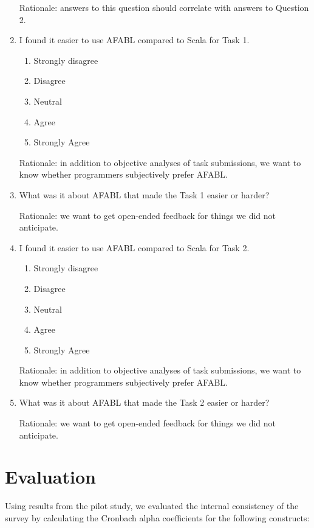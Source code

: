 \begin{enumerate}
Rationale: answers to this question should correlate with answers to Question 2.

\item I found it easier to use AFABL compared to Scala for Task 1.

\begin{enumerate}
\item Strongly disagree
\item Disagree
\item Neutral
\item Agree
\item Strongly Agree
\end{enumerate}

Rationale: in addition to objective analyses of task submissions, we want to know whether programmers subjectively prefer AFABL.

\item What was it about AFABL that made the Task 1 easier or harder?

Rationale: we want to get open-ended feedback for things we did not anticipate.

\item I found it easier to use AFABL compared to Scala for Task 2.

\begin{enumerate}
\item Strongly disagree
\item Disagree
\item Neutral
\item Agree
\item Strongly Agree
\end{enumerate}

Rationale: in addition to objective analyses of task submissions, we want to know whether programmers subjectively prefer AFABL.

\item What was it about AFABL that made the Task 2 easier or harder?

Rationale: we want to get open-ended feedback for things we did not anticipate.

\end{enumerate}

\section{Evaluation}

Using results from the pilot study, we evaluated the internal consistency of the survey by calculating the Cronbach alpha coefficients for the following constructs:

